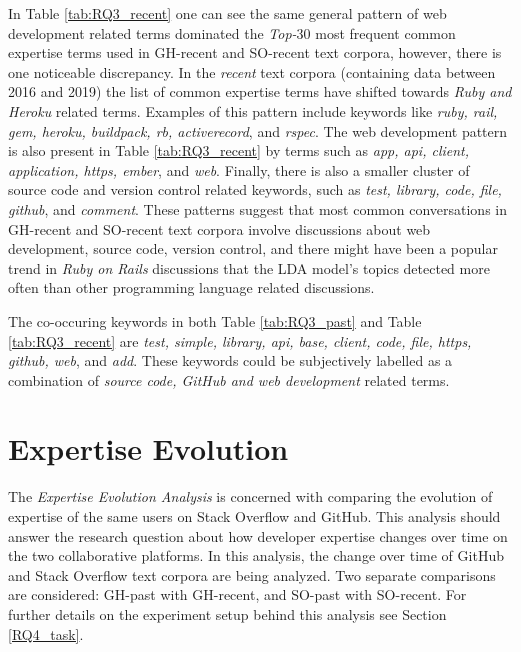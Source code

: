         In Table \ref{tab:RQ3_recent} one can see the same general pattern of web development related terms dominated the \emph{Top-$30$} most frequent common expertise terms used in GH-recent and SO-recent text corpora, however, there is one noticeable discrepancy. In the \emph{recent} text corpora (containing data between 2016 and 2019) the list of common expertise terms have shifted towards \emph{Ruby and Heroku} related terms. Examples of this pattern include keywords like \emph{ruby, rail, gem, heroku, buildpack, rb, activerecord}, and \emph{rspec}. The web development pattern is also present in Table \ref{tab:RQ3_recent} by terms such as \emph{app, api, client, application, https, ember}, and \emph{web}. Finally, there is also a smaller cluster of source code and version control related keywords, such as \emph{test, library, code, file, github}, and \emph{comment}. These patterns suggest that most common conversations in GH-recent and SO-recent text corpora involve discussions about web development, source code, version control, and there might have been a popular trend in \emph{Ruby on Rails} discussions that the LDA model's topics detected more often than other programming language related discussions. 
        
        The co-occuring keywords in both Table \ref{tab:RQ3_past} and Table \ref{tab:RQ3_recent} are \emph{test, simple, library, api, base, client, code, file, https, github, web}, and \emph{add}. These keywords could be subjectively labelled as a combination of \emph{source code, GitHub and web development} related terms. \\
        
    
    \section{Expertise Evolution\label{sec:results_rq4}}
        
        The \emph{Expertise Evolution Analysis} is concerned with comparing the evolution of expertise of the same users on Stack Overflow and GitHub. This analysis should answer the research question about how developer expertise changes over time on the two collaborative platforms. In this analysis, the change over time of GitHub and Stack Overflow text corpora are being analyzed. Two separate comparisons are considered: GH-past with GH-recent, and SO-past with SO-recent. For further details on the experiment setup behind this analysis see Section \ref{RQ4_task}.
        
